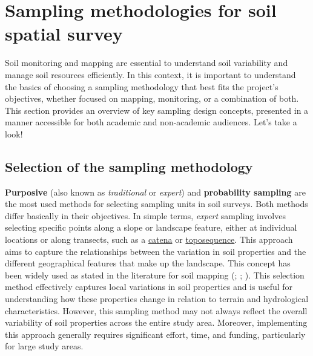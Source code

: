 \documentclass[
  10pt,
  b5paper,
  oneside]{book}
\begin{document}
\section{Sampling methodologies for soil spatial survey}\label{sampling-theory}

Soil monitoring and mapping are essential to understand soil variability and manage soil resources efficiently. In this context, it is important to understand the basics of choosing a sampling methodology that best fits the project's objectives, whether focused on mapping, monitoring, or a combination of both. This section provides an overview of key sampling design concepts, presented in a manner accessible for both academic and non-academic audiences. Let's take a look!

\subsection{Selection of the sampling methodology}\label{selection-methods}

\textbf{Purposive} (also known as \emph{traditional} or \emph{expert}) and \textbf{probability sampling} are the most used methods for selecting sampling units in soil surveys. Both methods differ basically in their objectives. In simple terms, \emph{expert} sampling involves selecting specific points along a slope or landscape feature, either at individual locations or along transects, such as a \ul{catena} or \ul{toposequence}. This approach aims to capture the relationships between the variation in soil properties and the different geographical features that make up the landscape. This concept has been widely used as stated in the literature for soil mapping (; ; ). This selection method effectively captures local variations in soil properties and is useful for understanding how these properties change in relation to terrain and hydrological characteristics. However, this sampling method may not always reflect the overall variability of soil properties across the entire study area. Moreover, implementing this approach generally requires significant effort, time, and funding, particularly for large study areas.
\end{document}
